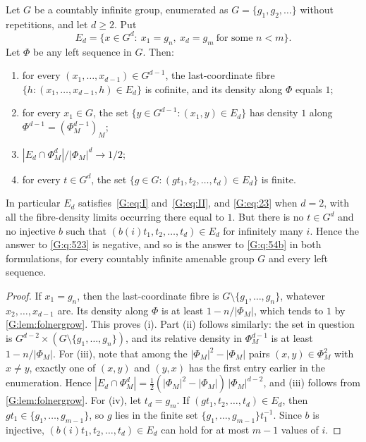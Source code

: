 \begin{theorem}\label{G:thm:q523literal}
Let $G$ be a countably infinite group, enumerated as $G=\{g_1,g_2,\dots\}$ without
repetitions, and let $d\ge2$. Put
\[
E_d=\{x\in G^d:\ x_1=g_n,\ x_d=g_m\ \text{for some } n<m\}.
\]
Let $\Phi$ be any left \Fol{} sequence in $G$. Then:
\begin{enumerate}[label=\textup{(\roman*)}]
\item for every $(x_1,\dots,x_{d-1})\in G^{d-1}$, the last-coordinate fibre
$\{h:(x_1,\dots,x_{d-1},h)\in E_d\}$ is cofinite, and its density along $\Phi$ equals $1$;
\item for every $x_1\in G$, the set $\{y\in G^{d-1}:(x_1,y)\in E_d\}$ has density $1$
along $\Phi^{d-1}=(\Phi_M^{d-1})_M$;
\item $|E_d\cap\Phi_M^d|/|\Phi_M|^d\to1/2$;
\item for every $t\in G^d$, the set $\{g\in G:(gt_1,t_2,\dots,t_d)\in E_d\}$ is finite.
\end{enumerate}
In particular $E_d$ satisfies~\eqref{G:eq:I} and~\eqref{G:eq:II}, and
\eqref{G:eq:23} when $d=2$, with all the fibre-density limits occurring there equal to $1$.
But there is no $t\in G^d$
and no injective $b$ such that $(b(i)t_1,t_2,\dots,t_d)\in E_d$ for infinitely many $i$.
Hence the answer to \cref{G:q:523} is negative, and so is the answer to \cref{G:q:54b} in both
formulations, for every countably infinite amenable group $G$ and every left \Fol{} sequence.
\end{theorem}

\begin{proof}
If $x_1=g_n$, then the last-coordinate fibre is $G\setminus\{g_1,\dots,g_n\}$, whatever
$x_2,\dots,x_{d-1}$ are. Its density along $\Phi$ is at least $1-n/|\Phi_M|$, which tends
to $1$ by \cref{G:lem:folnergrow}. This proves (i). Part (ii) follows similarly: the set in
question is $G^{d-2}\times(G\setminus\{g_1,\dots,g_n\})$, and its relative density in
$\Phi_M^{d-1}$ is at least $1-n/|\Phi_M|$. For (iii), note that among the
$|\Phi_M|^2-|\Phi_M|$ pairs $(x,y)\in\Phi_M^2$ with $x\neq y$, exactly one of $(x,y)$ and
$(y,x)$ has the first entry earlier in the enumeration. Hence
$|E_d\cap\Phi_M^d|=\frac12(|\Phi_M|^2-|\Phi_M|)\,|\Phi_M|^{d-2}$, and (iii) follows from
\cref{G:lem:folnergrow}. For (iv), let $t_d=g_m$. If $(gt_1,t_2,\dots,t_d)\in E_d$, then
$gt_1\in\{g_1,\dots,g_{m-1}\}$, so $g$ lies in the finite set
$\{g_1,\dots,g_{m-1}\}t_1^{-1}$. Since $b$ is injective, $(b(i)t_1,t_2,\dots,t_d)\in E_d$
can hold for at most $m-1$ values of $i$.
\end{proof}

